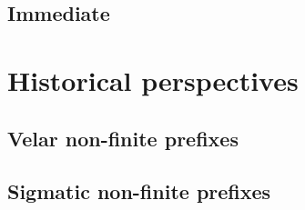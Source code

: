 \subsection{Immediate} \label{sec:immediate.converb}

\section{Historical perspectives} \label{sec:nmlz.historical.perspectives}

\subsection{Velar non-finite prefixes} \label{sec:velar.nmlz.history}

\subsection{Sigmatic non-finite prefixes} \label{sec:sigmatic.nmlz.history}